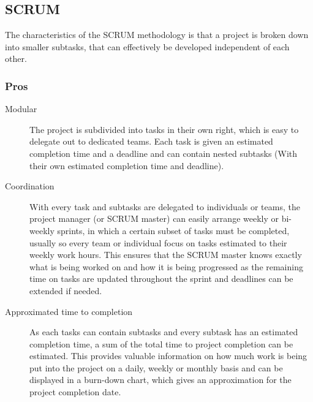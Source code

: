 \documentclass[11pt]{article}
\newcommand{\colbreak}{\vfill{\ }\columnbreak}
\begin{document}
\subsection{SCRUM}
\label{sec:A|sub:scrum}
The characteristics of the SCRUM methodology is that a project is broken down into smaller subtasks, that can effectively be developed independent of each other.

\begin{multicols}{2}
    \subsubsection{Pros}
    \begin{description}
    \item[Modular] The project is subdivided into tasks in their own right, which is easy to delegate out to dedicated teams. Each task is given an estimated completion time and a deadline and can contain nested subtasks (With their own estimated completion time and deadline). 
        \item[Coordination] With every task and subtasks are delegated to individuals or teams, the project manager (or SCRUM master) can easily arrange weekly or bi-weekly sprints, in which a certain subset of tasks must be completed, usually so every team or individual focus on tasks estimated to their weekly work hours. This ensures that the SCRUM master knows exactly what is being worked on and how it is being progressed as the remaining time on tasks are updated throughout the sprint and deadlines can be extended if needed.
        \item[Approximated time to completion] As each tasks can contain subtasks and every subtask has an estimated completion time, a sum of the total time to project completion can be estimated. This provides valuable information on how much work is being put into the project on a daily, weekly or monthly basis and can be displayed in a burn-down chart, which gives an approximation for the project completion date.
    \end{description}
    \colbreak
    

\end{multicols}
\end{document}
